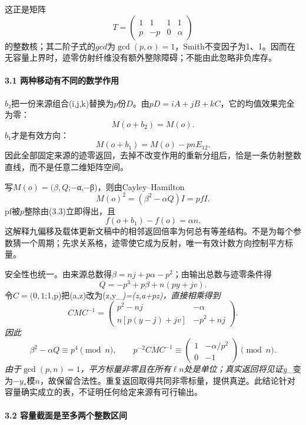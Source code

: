 {这正是矩阵} \[
T=\begin{pmatrix}1&1&1&1\\p&-p&0&\alpha\end{pmatrix}
\] {的整数核；其二阶子式的\ensuremath{gcd}为\ensuremath{\operatorname{gcd}(p,\alpha )=1}，Smith不变因子为1、1。因而在无容量上界时，迹零仿射纤维没有额外整除障碍；不能由此忽略非负库存。}

\paragraph*{\texorpdfstring{{3.1} {两种移动有不同的数学作用}}{3.1 两种移动有不同的数学作用}}\label{C10-h76}

{\ensuremath{b}₂把一份来源组合(i,j,k)替换为\ensuremath{p}份\ensuremath{D}。由\ensuremath{pD=iA+jB+kC}，它的均值效果完全为零：} \[
M(o+b_2)=M(o).
\tag{C10.3.5}
\] {\ensuremath{b}₁才是有效方向：} \[
M(o+b_1)=M(o)-pnE_{12}.
\tag{C10.3.6}
\] {因此全部固定来源的迹零返回，去掉不改变作用的重新分组后，恰是一条仿射整数直线，而不是任意二维矩阵空间。}

{写\ensuremath{M(o)=(\beta ,Q};−α,−β)，则由Cayley--Hamilton} \[
M(o)^2=(\beta^2-\alpha Q)I=p f I.
\] {pf被\ensuremath{p}整除由(3.3)立即得出，且} \[
\boxed{f(o+b_1)-f(o)=\alpha n.}
\tag{C10.3.7}
\] {这解释九偏移及载体更新文稿中的相邻返回倍率为何总有等差结构。不是为每个参数猜一个周期；先求关系格，迹零使它成为反射，唯一有效计数方向控制平方标量。}

{安全性也统一。由来源总数得\ensuremath{\beta =nj+p\alpha -p^{2}}；由输出总数与迹零条件得} \[
Q=-p^3+p\beta+n(py+jv).
\] {令\ensuremath{C=(0,1};1,p)把(a,z)改为(z,y\_}\emph{{)=(z,a+pz)，直接相乘得到} \[
CMC^{-1}=\begin{pmatrix}
p^2-nj&-\alpha\\
n[p(y-j)+jv]&-p^2+nj
\end{pmatrix}.
\] {因此} \[
\boxed{\beta^2-\alpha Q\equiv p^4\pmod n,\qquad
p^{-2}CMC^{-1}\equiv
\begin{pmatrix}1&-\alpha/p^2\\0&-1\end{pmatrix}\pmod n.}
\tag{C10.3.8}
\] {由于\ensuremath{\operatorname{gcd}(p,n)=1}，平方标量非零且在所有\ensuremath{\ell}\textbar{}\ensuremath{n}处是单位；真实返回将见证y\_}}{变为−\ensuremath{y_*}模\ensuremath{n}，故保留合法性。重复返回取得共同非零标量，提供真逆。此结论针对容量确实成立的表，不证明任何给定来源有可行输出。}

\paragraph*{\texorpdfstring{{3.2} {容量截面是至多两个整数区间}}{3.2 容量截面是至多两个整数区间}}\label{C10-h77}

